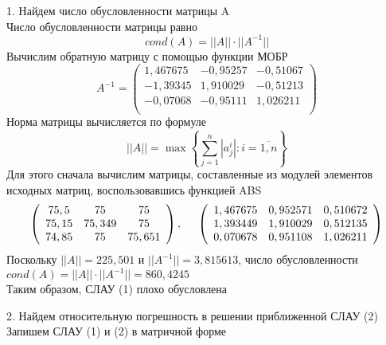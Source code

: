 \documentclass[12pt]{article}
\begin{document}
	1. Найдем число обусловленности матрицы A \\
	Число обусловленности матрицы равно
	\begin{equation*}
		cond\left(A\right)=||A|| \cdot ||A^{-1}||
	\end{equation*}
	Вычислим обратную матрицу с помощью функции МОБР
	\begin{equation*}
		A^{-1} = \left(
		\begin{array}{ccc}
			1,467675 & -0,95257 & -0,51067 \\
			-1,39345 & 1,910029 & -0,51213 \\
			-0,07068 & -0,95111	& 1,026211 \\
		\end{array}
		\right)
	\end{equation*}
Норма матрицы вычисляется по формуле
\begin{equation*}
	||A|| = \max\left\{ \sum_{j=1}^{n}|a^i_j|:i=\overline{1,n}\right\}
\end{equation*}
Для этого сначала вычислим матрицы, составленные из модулей элементов исходных
матриц, воспользовавшись функцией ABS
\begin{equation*}
	\left(
	\begin{array}{ccc}
		75,5 & 75 & 75\\
		75,15 & 75,349 & 75 \\
		74,85 & 75 & 75,651 \\
	\end{array}
	\right)
	,
	\hspace{0.5cm}
	\left(
	\begin{array}{ccc}
		1,467675 & 0,952571 & 0,510672 \\
		1,393449 & 1,910029 & 0,512135 \\
		0,070678 & 0,951108	& 1,026211 \\
	\end{array}
	\right)
\end{equation*}
Поскольку $||A||=225,501$ и $||A^{-1}||=3,815613$, число обусловленности $cond\left(A\right)=||A|| \cdot ||A^{-1}|| = 860,4245 $ \\
Таким образом, СЛАУ (1) плохо обусловлена

2. Найдем относительную погрешность в решении приближенной СЛАУ (2)
Запишем СЛАУ (1) и (2) в матричной форме
\end{document}
